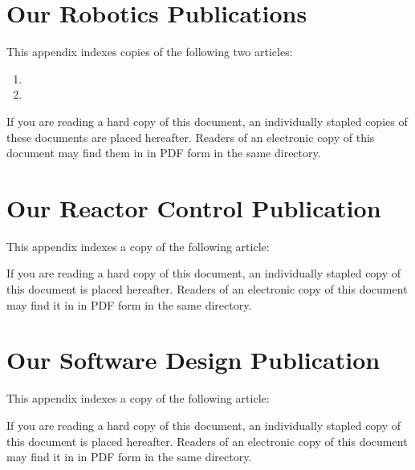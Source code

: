 \documentclass[11pt, letterpaper, oneside, openany, article]{memoir}
\author{Timothy A.\ V.\ Teatro}
\date{\Today}
\theoremstyle{plain}
\theoremstyle{definition}
\theoremstyle{remark}
\renewcommand{\theequation}{\oldstylenums{\arabic{equation}}}
\renewcommand{\theequation}{\oldstylenums{\arabic{chapter}.\arabic{equation}}}
\begin{document}

  

  {
    \hypersetup{hidelinks}
    \setcounter{tocdepth}{2}
    \tableofcontents
    \clearpage
  }

  
  
  
  
  \clearpage
  \appendix
  \renewcommand{\theequation}{\oldstylenums{\Alph{chapter}.\arabic{equation}}}
  
  \clearoage
  \printacronyms[name={List of Acronyms, Initialisms and Selected Jargon}, heading=chapter]
  \clearpage
  \chapter{Our Robotics Publications}%
  \label{chap:Pubs-Robotics}
    This appendix indexes copies of the following two articles:
    \begin{enumerate}
      \item {}
      \item {}
    \end{enumerate}
    If you are reading a hard copy of this document, an individually stapled copies of these documents are placed hereafter. Readers of an electronic copy of this document may find them in in PDF form in the same directory.
  \clearpage
    \chapter{Our Reactor Control Publication}%
    \label{chap:Pubs-Nuclear}
    This appendix indexes a copy of the following article:
    \begin{itemize}
    \end{itemize}
    If you are reading a hard copy of this document, an individually stapled copy of this document is placed hereafter. Readers of an electronic copy of this document may find it in in PDF form in the same directory.
\clearpage
    \chapter{Our Software Design Publication}%
    \label{chap:Pubs-Software}
    This appendix indexes a copy of the following article:
    \begin{itemize}
    \end{itemize}
    If you are reading a hard copy of this document, an individually stapled copy of this document is placed hereafter. Readers of an electronic copy of this document may find it in in PDF form in the same directory.
\clearpage
\backmatter%
  {
    \RaggedRight%
    \renewcommand\bibfont{\footnotesize}
    \printbibliography%
  }
  \printindex
\end{document}
